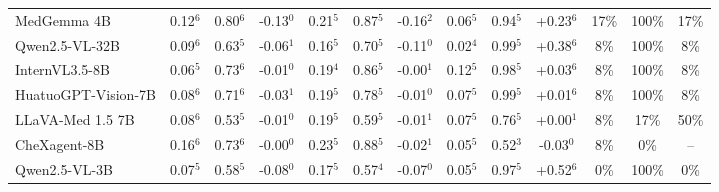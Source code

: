 \begin{table}[pos=t]
{\begin{tabular}{l@{\hspace{7pt}}ccc@{\hspace{4pt}}ccc@{\hspace{4pt}}ccc@{\hspace{4pt}}ccc}
MedGemma 4B & \cellcolor{cfSage3}0.12$^{6}$ & \cellcolor{cfSage3}0.80$^{6}$ & \cellcolor{cfSlate3}-0.13$^{0}$ & \cellcolor{cfSage4}0.21$^{5}$ & \cellcolor{cfSage3}0.87$^{5}$ & \cellcolor{cfSlate3}-0.16$^{2}$ & \cellcolor{cfSage2}0.06$^{5}$ & \cellcolor{cfSage4}0.94$^{5}$ & \cellcolor{cfTerra3}+0.23$^{6}$ & \cellcolor{cfTerra3}17\% & \cellcolor{cfTerra4}100\% & 17\% \\
Qwen2.5-VL-32B & \cellcolor{cfSage2}0.09$^{6}$ & \cellcolor{cfSage2}0.63$^{5}$ & \cellcolor{cfSlate2}-0.06$^{1}$ & \cellcolor{cfSage3}0.16$^{5}$ & \cellcolor{cfSage2}0.70$^{5}$ & \cellcolor{cfSlate3}-0.11$^{0}$ & \cellcolor{cfSage1}0.02$^{4}$ & \cellcolor{cfSage4}0.99$^{5}$ & \cellcolor{cfTerra4}+0.38$^{6}$ & \cellcolor{cfTerra2}8\% & \cellcolor{cfTerra4}100\% & 8\% \\
InternVL3.5-8B & \cellcolor{cfSage2}0.06$^{5}$ & \cellcolor{cfSage2}0.73$^{6}$ & \cellcolor{cfSlate1}-0.01$^{0}$ & \cellcolor{cfSage3}0.19$^{4}$ & \cellcolor{cfSage3}0.86$^{5}$ & \cellcolor{cfSlate1}-0.00$^{1}$ & \cellcolor{cfSage2}0.12$^{5}$ & \cellcolor{cfSage4}0.98$^{5}$ & \cellcolor{cfTerra2}+0.03$^{6}$ & \cellcolor{cfTerra2}8\% & \cellcolor{cfTerra4}100\% & 8\% \\
HuatuoGPT-Vision-7B & \cellcolor{cfSage2}0.08$^{6}$ & \cellcolor{cfSage2}0.71$^{6}$ & \cellcolor{cfSlate2}-0.03$^{1}$ & \cellcolor{cfSage3}0.19$^{5}$ & \cellcolor{cfSage3}0.78$^{5}$ & \cellcolor{cfSlate1}-0.01$^{0}$ & \cellcolor{cfSage2}0.07$^{5}$ & \cellcolor{cfSage4}0.99$^{5}$ & \cellcolor{cfTerra1}+0.01$^{6}$ & \cellcolor{cfTerra2}8\% & \cellcolor{cfTerra4}100\% & 8\% \\
LLaVA-Med 1.5 7B & \cellcolor{cfSage2}0.08$^{6}$ & \cellcolor{cfSage1}0.53$^{5}$ & \cellcolor{cfSlate1}-0.01$^{0}$ & \cellcolor{cfSage3}0.19$^{5}$ & \cellcolor{cfSage1}0.59$^{5}$ & \cellcolor{cfSlate1}-0.01$^{1}$ & \cellcolor{cfSage2}0.07$^{5}$ & \cellcolor{cfSage3}0.76$^{5}$ & \cellcolor{cfTerra1}+0.00$^{1}$ & \cellcolor{cfTerra2}8\% & \cellcolor{cfTerra2}17\% & 50\% \\
CheXagent-8B & \cellcolor{cfSage3}0.16$^{6}$ & \cellcolor{cfSage2}0.73$^{6}$ & \cellcolor{cfSlate1}-0.00$^{0}$ & \cellcolor{cfSage4}0.23$^{5}$ & \cellcolor{cfSage3}0.88$^{5}$ & \cellcolor{cfSlate1}-0.02$^{1}$ & \cellcolor{cfSage2}0.05$^{5}$ & \cellcolor{cfSage1}0.52$^{3}$ & \cellcolor{cfSlate2}-0.03$^{0}$ & \cellcolor{cfTerra2}8\% & \cellcolor{cfTerra1}0\% & -- \\
Qwen2.5-VL-3B & \cellcolor{cfSage2}0.07$^{5}$ & \cellcolor{cfSage1}0.58$^{5}$ & \cellcolor{cfSlate2}-0.08$^{0}$ & \cellcolor{cfSage3}0.17$^{5}$ & \cellcolor{cfSage1}0.57$^{4}$ & \cellcolor{cfSlate2}-0.07$^{0}$ & \cellcolor{cfSage1}0.05$^{5}$ & \cellcolor{cfSage4}0.97$^{5}$ & \cellcolor{cfTerra4}+0.52$^{6}$ & \cellcolor{cfTerra1}0\% & \cellcolor{cfTerra4}100\% & 0\% \\

\end{tabular}}
\end{table}
